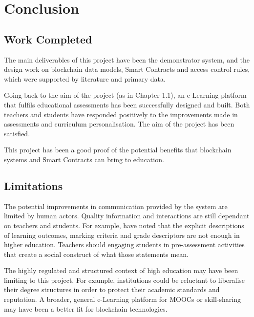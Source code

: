 \chapter{Conclusion}

\section{Work Completed}

The main deliverables of this project have been the demonstrator system, and the 
design work on blockchain data models, Smart Contracts and access control rules, 
which were supported by literature and primary data.

Going back to the aim of the project (as in Chapter 1.1), an e-Learning platform 
that fulfils educational assessments has been successfully designed and built. 
Both teachers and students have responded positively to the improvements made 
in assessments and curriculum personalisation. The aim of the project has been satisfied.

This project has been a good proof of the potential benefits that blockchain systems 
and Smart Contracts can bring to education.

\section{Limitations}

The potential improvements in communication provided by the system are limited 
by human actors. Quality information and interactions are still dependant on  
teachers and students.
For example, \citet{bryan2006innovative} have noted that the explicit descriptions of 
learning outcomes, marking criteria and grade descriptors are not enough in higher education.
Teachers should engaging students in pre-assessment activities that create a 
social construct of what those statements mean.

The highly regulated and structured context of high education may have been limiting 
to this project. For example, institutions could be reluctant to liberalise their 
degree structures in order to protect their academic standards and reputation. 
A broader, general e-Learning platform for MOOCs or skill-sharing 
may have been a better fit for blockchain technologies.


